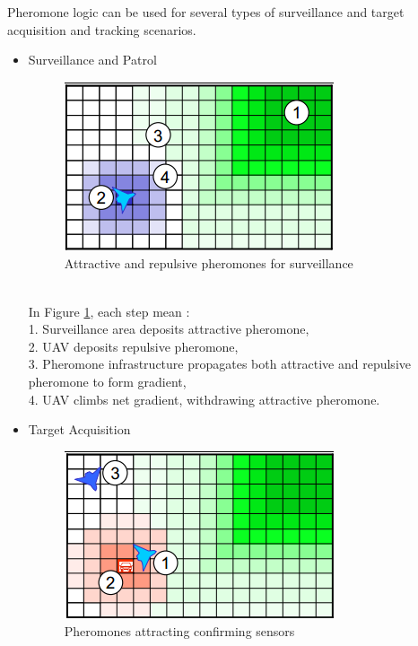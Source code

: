 Pheromone logic  can  be  used  for  several  types  of  surveillance  and target  acquisition  and  tracking scenarios.\\

\begin{itemize}
\item Surveillance and Patrol

\begin{figure}[h]
\center
\includegraphics[scale=0.7]{../images/pheromone_surveillance.png}
\caption{\label{surveillance}Attractive and repulsive pheromones for surveillance}
\end{figure}\\

In Figure \ref{surveillance}, each step mean :\\
 1. Surveillance area deposits attractive pheromone,\\
 2. UAV deposits repulsive pheromone,\\ 
 3. Pheromone infrastructure propagates both attractive and repulsive pheromone to form gradient,\\
 4. UAV climbs net gradient, withdrawing attractive pheromone.
 
\item Target Acquisition

\begin{figure}[h]
\center
\includegraphics[scale=0.7]{../images/pheromone_target_acquisition.png}
\caption{\label{targetacquisition}Pheromones attracting confirming sensors}
\end{figure}\\


\end{itemize}
